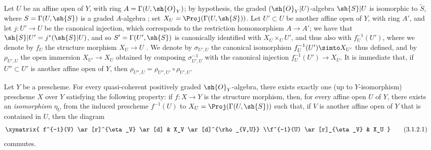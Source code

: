 \begin{env}[3.1.1]
Let $U$ be an affine open of $Y$, with ring $A=\Gamma(U,\sh{O}_Y)$;
by hypothesis, the graded $(\sh{O}_Y|U)$-algebra $\sh{S}|U$ is isomorphic to $\widetilde{S}$, where $S=\Gamma(U,\sh{S})$ is a graded $A$-algebra ;
set $X_U=\Proj(\Gamma(U,\sh{S}))$.
Let $U'\subset U$ be another affine open of $Y$, with ring $A'$, and let $j:U'\to U$ be the canonical injection, which corresponds to the restriction homomorphism $A\to A'$;
we have that $\sh{S}|U'=j^*(\sh{S}|U)$, and so $S'=\Gamma(U',\sh{S})$ is canonically identified with $X_U\times_U U'$, and thus also with $f_U^{-1}(U')$, where we denote by $f_U$ the structure morphism $X_U\to U$ .
We denote by $\sigma_{U',U}$ the canonical isomorphism $f_U^{-1}(U')\simto X_{U'}$ thus defined, and by $\rho_{U',U}$ the open immersion $X_{U'}\to X_U$ obtained by composing $\sigma_{U',U}^{-1}$ with the canonical injection $f_U^{-1}(U')\to X_U$.
It is immediate that, if $U''\subset U'$ is another affine open of $Y$, then $\rho_{U'',U}=\rho_{U'',U'}\circ\rho_{U',U}$.
\end{env}

\begin{proposition}[3.1.2]
\label{II.3.1.2}
Let $Y$ be a prescheme.
For every quasi-coherent positively graded $\sh{O}_Y$-algebra, there exists exactly one (up to $Y$-isomorphism) prescheme $X$ over $Y$ satisfying the following property:
if $f:X\to Y$ is the structure morphism, then, for every affine open $U$ of $Y$, there exists an \emph{isomorphism} $\eta_U$ from the induced prescheme $f^{-1}(U)$ to $X_U=\Proj(\Gamma(U,\sh{S}))$ such that, if $V$ is another affine open of $Y$ that is contained in $U$, then the diagram
\[
\label{II.3.1.2.1}
  \xymatrix{
    f^{-1}(V) \ar[r]^{\eta_V} \ar[d]
    & X_V \ar[d]^{\rho_{V,U}}
  \\f^{-1}(U) \ar[r]_{\eta_V}
    & X_U
  }
\tag{3.1.2.1}
\]
commutes.
\end{proposition}

